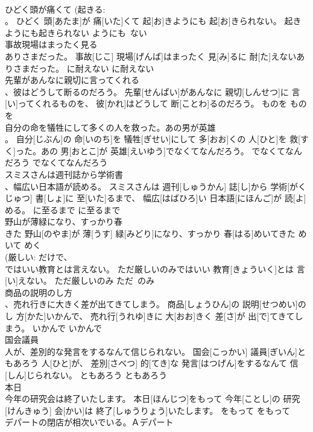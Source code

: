 \documentclass[8pt]{extreport}
\begin{document}
\begin{CJK}{UTF8}{min}
\\	ひどく頭が痛くて (起きる: 
\\	。	ひどく 頭[あたま]が 痛[いた]くて 起[お]きようにも 起[お]きられない。	起きようにも起きられない	ようにも~ない	
\\	事故現場はまったく見る 
\\	ありさまだった。	事故[じこ] 現場[げんば]はまったく 見[み]るに 耐[た]えないありさまだった。	に耐えない	に耐えない	
\\	先輩があんなに親切に言ってくれる 
\\	、彼はどうして断るのだろう。	先輩[せんぱい]があんなに 親切[しんせつ]に 言[い]ってくれるものを、 彼[かれ]はどうして 断[ことわ]るのだろう。	ものを	ものを	
\\	自分の命を犠牲にして多くの人を救った。あの男が英雄 
\\	。	自分[じぶん]の 命[いのち]を 犠牲[ぎせい]にして 多[おお]くの 人[ひと]を 救[すく]った。あの 男[おとこ]が 英雄[えいゆう]でなくてなんだろう。	でなくてなんだろう	でなくてなんだろう	
\\	スミスさんは週刊誌から学術書　
\\	、幅広い日本語が読める。	スミスさんは 週刊[しゅうかん] 誌[し]から 学術[がくじゅつ] 書[しょ]に 至[いた]るまで、 幅広[はばひろ]い 日本語[にほんご]が 読[よ]める。	に至るまで	に至るまで	
\\	野山が薄緑になり、すっかり春 
\\	きた	野山[のやま]が 薄[うす] 緑[みどり]になり、すっかり 春[はる]めいてきた	めいて	めく	
\\	(厳しい: だけで、
\\	ではいい教育とは言えない。	ただ厳しいのみではいい 教育[きょういく]とは 言[い]えない。	ただ厳しいのみ	ただ~のみ	
\\	商品の説明のし方 
\\	、売れ行きに大きく差が出てきてしまう。	商品[しょうひん]の 説明[せつめい]のし 方[かた]いかんで、 売れ行[うれゆ]きに 大[おお]きく 差[さ]が 出[で]てきてしまう。	いかんで	いかんで	
\\	国会議員 
\\	人が、差別的な発言をするなんて信じられない。	国会[こっかい] 議員[ぎいん]ともあろう 人[ひと]が、 差別[さべつ] 的[てき]な 発言[はつげん]をするなんて 信[しん]じられない。	ともあろう	ともあろう	
\\	本日 
\\	今年の研究会は終了いたします。	本日[ほんじつ]をもって 今年[ことし]の 研究[けんきゅう] 会[かい]は 終了[しゅうりょう]いたします。	をもって	をもって	
\\	デパートの閉店が相次いでいる。Ａデパート 

\end{CJK}
\end{document}
